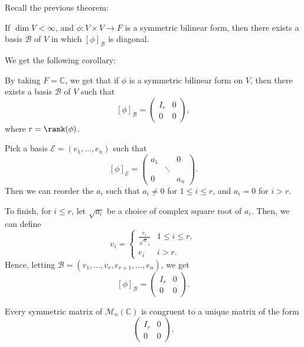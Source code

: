 \documentclass[12pt]{article}
\begin{document}
Recall the previous theorem:

\begin{theorem}
	If $\dim V < \infty$, and $\phi : V \times V \to F$ is a symmetric bilinear form, then there exists a basis $\mathcal{B}$ of $V$ in which $[\phi]_{\mathcal{B}}$ is diagonal.
\end{theorem}

We get the following corollary:

\begin{corollary}
	By taking $F = \mathbb{C}$, we get that if $\phi$ is a symmetric bilinear form on $V$, then there exists a basis $\mathcal{B}$ of $V$ such that
	\[
		[\phi]_{\mathcal{B}} =
		\begin{pmatrix}
			I_r & 0 \\
			0 & 0
		\end{pmatrix}
	,\]
	where $r = \rank(\phi)$.
\end{corollary}

\begin{proofbox}
	Pick a basis $\mathcal{E} = (e_1, \ldots, e_n)$ such that
	\[
		[\phi]_{\mathcal{E}} =
		\begin{pmatrix}
			a_1 & & 0 \\
			    & \ddots & \\
			0 & & a_n
		\end{pmatrix}
	.\]
	Then we can reorder the $a_i$ such that $a_i \neq 0$ for $1 \leq i \leq r$, and $a_i = 0$ for $i > r$.

	To finish, for $i \leq r$, let $\sqrt{a_i}$ be a choice of complex square root of $a_i$. Then, we can define
	\[
	v_i =
	\begin{cases}
		\frac{e_i}{\sqrt a_i} & 1 \leq i \leq r,\\
		e_i & i > r.
	\end{cases}
	\]
	Hence, letting $\mathcal{B} = (v_1, \ldots, v_r, e_{r+1}, \ldots, e_n)$, we get
	\[
		[\phi]_{\mathcal{B}} =
		\begin{pmatrix}
			I_r & 0 \\
			0 & 0
		\end{pmatrix}
	.\]
\end{proofbox}

\begin{corollary}
	Every symmetric matrix of $\mathcal{M}_n(\mathbb{C})$ is congruent to a unique matrix of the form
	\[
	\begin{pmatrix}
		I_r & 0 \\
		0 & 0
	\end{pmatrix}
	.\]
\end{corollary}
\end{document}
